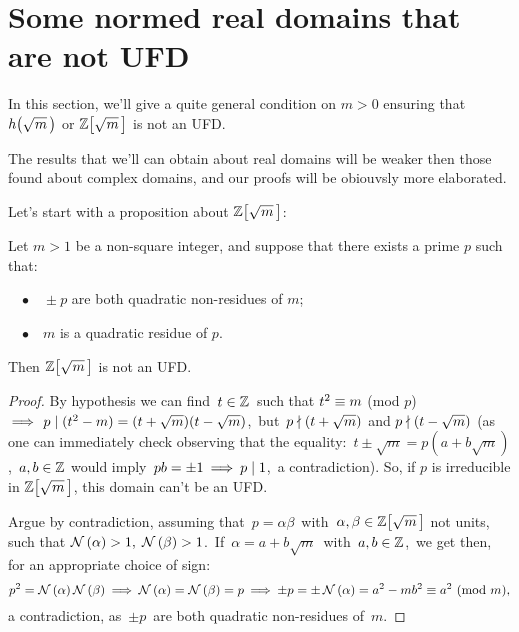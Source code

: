 \section{Some normed real domains that are not UFD}

In this section, we'll give a quite general condition on $m > 0$
ensuring that $\hh{m}$ or $\ZZ{m}$ is not an UFD.

The results that we'll can obtain about real domains will be
weaker then those found about complex domains, and our proofs
will be obiouvsly more elaborated.

\bigskip

Let's start with a proposition about $\ZZ{m}$:
\begin{thm}\label{basic_negative_result_for_uniqueness_1}
Let $m > 1$ be a non-square integer, and suppose that
there exists a prime $p$ such that:

~~$\bullet\quad\!\!\! \pm{p}$ are both quadratic non-residues
of $m$;

~~$\bullet\quad\!\! m$ is a quadratic residue of $p$.

Then $\ZZ{m}$ is not an UFD.
\end{thm}

\begin{proof} 
%
By hypothesis we can find\, $t \in \mathbb{Z}$\, such that
$t^2 \equiv m$ (mod $p$)\:$\:\Longrightarrow\:\, p \mid
(t^2 - m) = (t + \sqrt{m})(t - \sqrt{m})$,\, but\,
$p \nmid (t + \sqrt{m})$ and
$p \nmid (t - \sqrt{m})$
(as one can immediately check observing that the
equality: \,$t \pm{\sqrt{m}} = p(a + b \sqrt{m})$,\,
$a, b \in \mathbb{Z}$\: would imply\, $pb = \pm{1} \:\Longrightarrow\:
p \mid 1$,\, a contradiction).
So, if $p$ is irreducible in $\ZZ{m}$, this domain
can't be an UFD.

Argue by contradiction, assuming that\,
$p = \alpha \beta$\, with\, $\alpha,\beta \in \ZZ{m}$
not units, \ie such that $\mathcal{N}\left(\alpha\right) > 1,\;
\mathcal{N}\left(\beta\right) > 1$.\, If\, $\alpha = a + b\sqrt{m}$\, with\,
$a,b \in \mathbb{Z}$,\, we get then, for an appropriate choice of
sign:
$$
p^2 = \mathcal{N}\left(\alpha\right)\mathcal{N}\left(\beta\right) \:\Longrightarrow\: \mathcal{N}\left(\alpha\right) =
\mathcal{N}\left(\beta\right) = p \:\Longrightarrow\: \pm{p} = \pm{\,\mathcal{N}\left(\alpha\right)} = 
a^2 - mb^2 \equiv a^2\ (\mathrm{mod}\ m),
$$
a contradiction, as \,$\pm p$\, are both quadratic non-residues
of \,$m$.
%
\end{proof}

